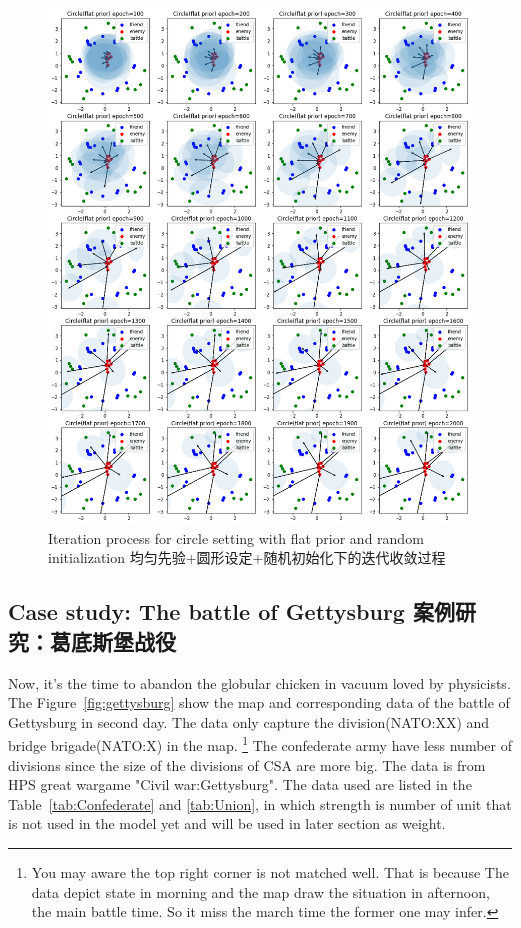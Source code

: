 \documentclass{article}
\begin{document}
\begin{figure}[ht]
\includegraphics[width=0.99\linewidth]{circle_iteration.png}
\caption{Iteration process for circle setting with flat prior and random initialization
均匀先验+圆形设定+随机初始化下的迭代收敛过程}
\label{fig:circleIteration}
\end{figure}

\subsection{Case study: The battle of Gettysburg 案例研究：葛底斯堡战役}

Now, it's the time to abandon the globular chicken in vacuum loved by physicists.
The Figure~\ref{fig:gettysburg} show the map and corresponding data of the battle of Gettysburg in second day.
The data only capture the division(NATO:XX) and bridge brigade(NATO:X) in the map.
\footnote{You may aware the top right corner is not matched well. 
That is because The data depict state in morning and the map draw the situation in afternoon, the main battle time.
So it miss the march time the former one may infer.}
The confederate army have less number of divisions since the size of the divisions of CSA are more big.
The data is from HPS great wargame "Civil war:Gettysburg". 
The data used are listed in the Table~\ref{tab:Confederate} and \ref{tab:Union}, in which strength 
is number of unit that is not used in the model yet and will be used in later section as weight.
\end{document}
